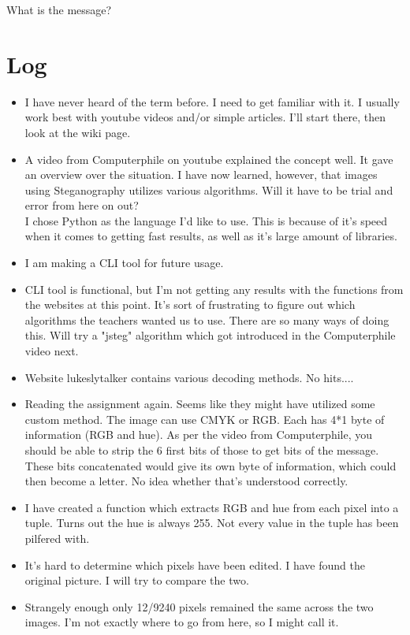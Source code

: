 \documentclass[11pt,a4paper]{article}
\begin{document}
What is the message?

\section{Log}
\begin{itemize}
	\item I have never heard of the term before. I need to get familiar with it. I usually work best with youtube videos 		and/or simple articles. I'll start there, then look at the wiki page.
	\item A video from Computerphile on youtube explained the concept well. It gave an overview over the situation. I have 	now learned, however, that images using Steganography utilizes various algorithms. Will it have to be trial and error 		from here on out?\\
	
	I chose Python as the language I'd like to use. This is because of it's speed when it comes to getting fast results, 		as well as it's large amount of libraries. 
	\item I am making a CLI tool for future usage.
	\item CLI tool is functional, but I'm not getting any results with the functions from the websites at this point. It's 	sort of frustrating to figure out which algorithms the teachers wanted us to use. There are so many ways of doing 			this. Will try a "jsteg" algorithm which got introduced in the Computerphile video next.
	\item Website lukeslytalker contains various decoding methods. No hits....
	\item Reading the assignment again. Seems like they might have utilized some custom method. The image can use CMYK or 		RGB. Each has 4*1 byte of information (RGB and hue). As per the video from Computerphile, you should be able to strip 		the 6 first bits of those to get bits of the message. These bits concatenated would give its own byte of information, 		which could then become a letter. No idea whether that's understood correctly.
	\item I have created a function which extracts RGB and hue from each pixel into a tuple. Turns out the hue is always 255. Not every value in the tuple has been pilfered with.
	\item It's hard to determine which pixels have been edited. I have found the original picture. I will try to compare the two.
	\item Strangely enough only 12/9240 pixels remained the same across the two images. I'm not exactly where to go from here, so I might call it.
	
	
	
\end{itemize}
\end{document}
